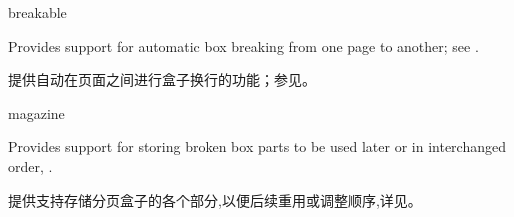 \begin{docTcbKey}[library]{breakable}{}{}

Provides support for automatic box breaking from one page to another;
see .


提供自动在页面之间进行盒子换行的功能；参见。

\end{docTcbKey}


\begin{docTcbKey}[library]{magazine}{}{}

Provides support for storing broken box parts to be used later or
in interchanged order, .

提供支持存储分页盒子的各个部分,以便后续重用或调整顺序,详见。

\end{docTcbKey}
















